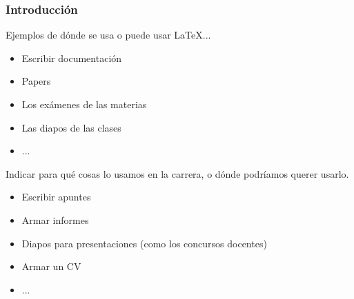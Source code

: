 \begin{frame}
\frametitle{Introducción}
    Ejemplos de dónde se usa o puede usar \LaTeX ...
    \begin{itemize}
    \item Escribir documentación
    \item Papers
    \item Los exámenes de las materias
    \item Las diapos de las clases
    \item ...
    \end{itemize}
    Indicar para qué cosas lo usamos en la carrera, o dónde podríamos querer usarlo.
    \begin{itemize}
    \item Escribir apuntes
    \item Armar informes
    \item Diapos para presentaciones (como los concursos docentes)
    \item Armar un CV
    \item ...
    \end{itemize}
\end{frame}
